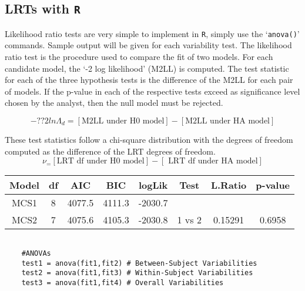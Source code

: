\documentclass[12pt, a4paper]{report}
\theoremstyle{plain}
\theoremstyle{definition}
\theoremstyle{remark}
\begin{document}
\subsection{LRTs with \texttt{R}}
Likelihood ratio tests are very simple to implement in \texttt{R}, simply use the `\texttt{anova()}'
commands. Sample output will be given for each variability test. The likelihood ratio
test is the procedure used to compare the fit of two models. For each candidate model,
the `-2 log likelihood' (M2LL) is computed. The test statistic for each of the three
hypothesis tests is the difference of the M2LL for each pair of models. If the p-value
in each of the respective tests exceed as significance level chosen by the analyst, then
the null model must be rejected.

\begin{equation}
-??2 ln \Lambda_d = [\mbox{M2LL under H0 model}] - [\mbox{M2LL under HA model}] 
\end{equation}

These test statistics follow a chi-square distribution with the degrees of freedom
computed as the difference of the LRT degrees of freedom.
\begin{equation}
\nu_ = [ \mbox{LRT df under H0 model}] - [\mbox{ LRT df under HA model}]
\end{equation}

%
%
%
\begin{center}
	\begin{tabular}{|c|c|c|c|c|c|c|c|}
		\hline
		Model   &      df &   AIC  & BIC      & logLik & Test & L.Ratio & p-value \\ \hline
		MCS1    &       8 & 4077.5 & 4111.3 & -2030.7  &       &         &        \\ \hline
		MCS2    &       7 & 4075.6 & 4105.3 & -2030.8  & 1 vs 2 & 0.15291 & 0.6958 \\
		\hline 
	\end{tabular} 
\end{center}
\begin{framed}
	\begin{verbatim}
	
	#ANOVAs
	test1 = anova(fit1,fit2) # Between-Subject Variabilities
	test2 = anova(fit1,fit3) # Within-Subject Variabilities
	test3 = anova(fit1,fit4) # Overall Variabilities
	
	\end{verbatim}
\end{framed}
\end{document}
